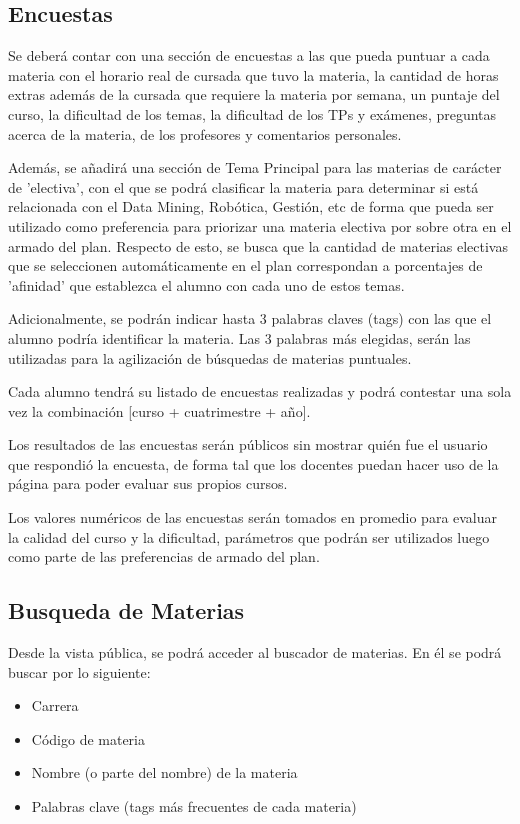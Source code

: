 \documentclass[a4paper]{article}
\begin{document}
\subsection{Encuestas}

Se deberá contar con una sección de encuestas a las que pueda puntuar a cada materia con el horario real de cursada que tuvo la materia, la cantidad de horas extras además de la cursada que requiere la materia por semana, un puntaje del curso, la dificultad de los temas, la dificultad de los TPs y exámenes, preguntas acerca de la materia, de los profesores y comentarios personales.

Además, se añadirá una sección de Tema Principal para las materias de carácter de 'electiva', con el que se podrá clasificar la materia para determinar si está relacionada con el Data Mining, Robótica, Gestión, etc de forma que pueda ser utilizado como preferencia para priorizar una materia electiva por sobre otra en el armado del plan. Respecto de esto, se busca que la cantidad de materias electivas que se seleccionen automáticamente en el plan correspondan a porcentajes de 'afinidad' que establezca el alumno con cada uno de estos temas.

Adicionalmente, se podrán indicar hasta 3 palabras claves (tags) con las que el alumno podría identificar la materia. Las 3 palabras más elegidas, serán las utilizadas para la agilización de búsquedas de materias puntuales.

Cada alumno tendrá su listado de encuestas realizadas y podrá contestar una sola vez la combinación [curso + cuatrimestre + año].

Los resultados de las encuestas serán públicos sin mostrar quién fue el usuario que respondió la encuesta, de forma tal que los docentes puedan hacer uso de la página para poder evaluar sus propios cursos.

Los valores numéricos de las encuestas serán tomados en promedio para evaluar la calidad del curso y la dificultad, parámetros que podrán ser utilizados luego como parte de las preferencias de armado del plan.

\subsection{Busqueda de Materias}

Desde la vista pública, se podrá acceder al buscador de materias. En él se podrá buscar por lo siguiente:

\begin{itemize}
	\item Carrera
	\item Código de materia
	\item Nombre (o parte del nombre) de la materia
	\item Palabras clave (tags más frecuentes de cada materia)
\end{itemize}
\end{document}
